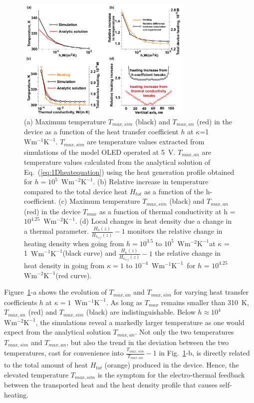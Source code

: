 \documentclass[%
9pt,
 aip,
rsi,%
 amsmath,amssymb,
preprint,%
]{revtex4-1}
\newcommand{\thermalconductivity}{$\mathrm{W m^{-1} K^{-1}}$}
\newcommand{\hcoefficient}{$\mathrm{W m^{-2} K^{-1}}$}
\begin{document}
\begin{figure}
	\centering
	\includegraphics[width=0.75\textwidth]{General_plots_4.pdf}
	\caption{(a) Maximum temperature $T_{max,sim}$ (black) and $T_{max,an}$ (red) in the device as a function of the heat transfer coefficient $h$ at $\kappa$=1~\thermalconductivity. $T_{max,sim}$ are temperature values extracted from simulations of the model OLED operated at 5~V. $T_{max,an}$ are temperature values calculated from the analytical solution of Eq.~(\ref{eq:1Dheatequation}) using the heat generation profile obtained for $h=10^5$~\hcoefficient. (b) Relative increase in temperature compared to the total device heat $H_{tot}$ as a function of the h-coefficient. (c) Maximum temperature $T_{max,sim}$ (black) and $T_{max,an}$ (red) in the device $T_{max}$ as a function of thermal conductivity at h = $10^{4.25}$~\hcoefficient. (d) Local changes in heat density due a change in a thermal parameter. $\frac{H_{h}(z)}{H_{h_{ref}}(z)}-1$ monitors the relative change in heating density when going from $h = 10^{3.5}$ to $10^5$~\hcoefficient at $\kappa$ = 1~\thermalconductivity (black curve) and $\frac{H_{\kappa}(z)}{H_{\kappa_{ref}}(z)}-1$ the relative change in heat density in going from
	$\kappa = 1$ to $10^{-4}$~\thermalconductivity~for $h$ = $10^{4.25}$~\hcoefficient (red curve).}
	\label{fig:final4plots}
\end{figure}

Figure~\ref{fig:final4plots}-a shows the evolution of $T_{max,an}$ and $T_{max,sim}$ for varying heat transfer coefficients $h$ at $\kappa = 1$~\thermalconductivity. 
As long as $T_{max}$ remains smaller than 310~K, $T_{max,an}$ (red) and $T_{max,sim}$ (black) are indistinguishable.
Below $h \approx 10^4$~\hcoefficient, the simulations reveal a markedly larger temperature as one would expect from the analytical solution $T_{max,an}$. 
Not only the two temperatures $T_{max,sim}$ and $T_{max,an}$, but also the trend in the deviation between the two temperatures, cast for convenience into $\frac{T_{max,sim}}{T_{max,an}}-1$ in Fig.~\ref{fig:final4plots}-b, is directly related to the total amount of heat $H_{tot}$ (orange) produced in the device.
Hence, the elevated temperature $T_{max,sim}$ is the symptom for the electro-thermal feedback between the transported heat and the heat density profile that causes self-heating.
\end{document}
